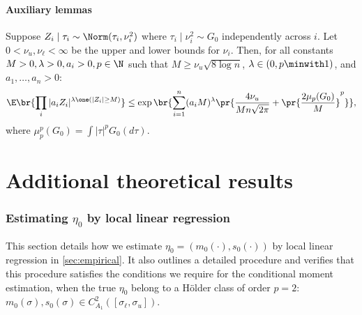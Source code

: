\documentclass[12pt, reqno]{amsart}
\newcommand{\sigl}{\sigma_\ell}
\newcommand{\sigu}{\sigma_u}
\numberwithin{equation}{section}
\begin{document}
\begin{refsection}
\begin{appendices}
\subsection{Auxiliary lemmas}

\begin{lemma}
\label{lemma:boundsecond}

Suppose $Z_i \mid \tau_i \sim \Norm(\tau_i, \nu_i^2)$ where $\tau_i \mid \nu_i^2 \sim G_0$
independently across $i$. Let $0 < \nu_u, \nu_\ell <\infty$ be the upper and lower bounds
for $\nu_i$. Then,
for all constants $M > 0,\lambda > 0,a_i > 0, p \in \N$
such that $M \ge
\nu_u \sqrt{8\log n}$,
$\lambda \in (0, p\minwith 1)$, and $a_1,\ldots, a_n > 0$:\[
\E\br{\prod_i |a_i Z_i|^{\lambda \one(|Z_i|\ge M)}} \le \exp\br{
    \sum_{i=1}^n (a_i M)^{\lambda} \pr{\frac{4\nu_u}{Mn\sqrt{2\pi}} + \pr{\frac{2\mu_p
    (G_0)}
    {M}}^p}
},
\]
where $\mu_p^p(G_0) = \int |\tau|^p G_0(d\tau)$.
\end{lemma}



\newpage 


\part{Additional theoretical results}

\section{Estimating $\eta_0$ by local linear regression}
\label{sec:nuisance_estimation}

This section details how we estimate $\eta_0 = (m_0(\cdot), s_0(\cdot))$ by local linear
regression in \cref{sec:empirical}. It also outlines a detailed procedure and verifies
that this procedure satisfies the conditions we require for the conditional moment
estimation, when the true $\eta_0$ belong to a H\"older class of order $p=2$:
$m_0(\sigma), s_0(\sigma) \in C_{A_1}^2([\sigl,
\sigu])$. 


\end{appendices}
\end{refsection}
\end{document}
